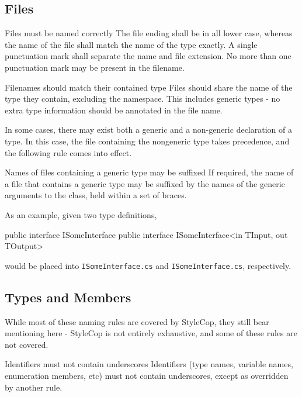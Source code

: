 \documentclass[11pt,a4paper]{article}
\newcounter{rule}[section]
\begin{document}
\subsection{Files}
\begin{must}{Files must be named correctly}
The file ending shall be in all lower case, whereas the name of the file shall match the name of the type exactly. A single punctuation mark shall separate the name and file extension. No more than one punctuation mark may be present in the filename.
\end{must}

\begin{should}{Filenames should match their contained type}
Files should share the name of the type they contain, excluding the namespace. This includes generic types - no extra type information should be annotated in the file name.
\end{should}

In some cases, there may exist both a generic and a non-generic declaration of a type. In this case, the file containing the nongeneric type takes precedence, and the following rule comes into effect.

\begin{may}{Names of files containing a generic type may be suffixed}
If required, the name of a file that contains a generic type may be suffixed by the names of the generic arguments to the class, held within a set of braces.
\end{may}

As an example, given two type definitions,

\begin{code}
public interface ISomeInterface { }
public interface ISomeInterface<in TInput, out TOutput> { }
\end{code}

would be placed into \texttt{ISomeInterface.cs} and \texttt{ISomeInterface.cs}, respectively.

\subsection{Types and Members}
While most of these naming rules are covered by StyleCop, they still bear mentioning here - StyleCop is not entirely exhaustive, and some of these rules are not covered.

\begin{must}{Identifiers must not contain underscores}
Identifiers (type names, variable names, enumeration members, etc) must not contain underscores, except as overridden by another rule.
\end{must}
\end{document}
